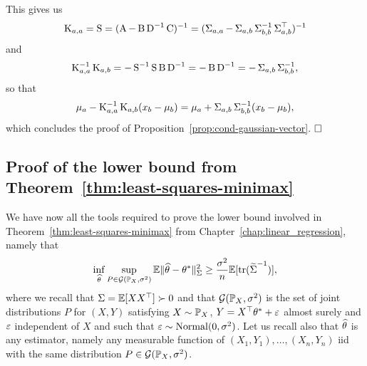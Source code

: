 This gives us
\begin{equation*}
	\bK_{a, a} = \bS = (\bA - \bB \bD^{-1} \bC)^{-1} = (\bSigma_{a,a} - \bSigma_{a,b} \bSigma_{b,b}^{-1} \bSigma_{a,b}^\top)^{-1}
\end{equation*}
and
\begin{equation*}
	\bK_{a,a}^{-1} \bK_{a,b} = - \bS^{-1} \bS \bB \bD^{-1} = - \bB \bD^{-1} = - \bSigma_{a,b} \bSigma_{b,b}^{-1},
\end{equation*}
so that
\begin{align*}
	\mu_a - \bK_{a, a}^{-1} \bK_{a, b} (x_b - \mu_b) = \mu_a + \bSigma_{a,b} \bSigma_{b,b}^{-1} (x_b - \mu_b),
\end{align*}
which concludes the proof of Proposition~\ref{prop:cond-gaussian-vector}. $\hfill \square$



\subsection{Proof of the lower bound from Theorem~\ref{thm:least-squares-minimax}} %
\label{sec:proof_of_the_minimax_lower_bound_}

We have now all the tools required to prove the lower bound involved in Theorem~\ref{thm:least-squares-minimax} from Chapter~\ref{chap:linear_regression}, namely that
\begin{equation}
	\inf_{\wh \theta} \sup_{P \in \cG(\P_X, \sigma^2)} \E \norm{\wh \theta - \theta^*}_{\bSigma}^2 
	\geq \frac{\sigma^2}{n} \E [\tr({\wt \bSigma}^{-1})],
\end{equation}
where we recall that  $\bSigma = \E[X X^\top] \succ 0$ and that $\cG(\P_X, \sigma^2)$ is the set of joint distributions $P$ for $(X, Y)$ satisfying $X \sim \P_X$, $Y = X^\top \theta^* + \eps$ almost surely and $\eps$ independent of $X$ and such that $\eps \sim \nor(0, \sigma^2)$.
Let us recall also that $\wh \theta$ is any estimator, namely any measurable function of $(X_1, Y_1), \ldots, (X_n, Y_n)$ iid with the same distribution $P \in \cG(\P_X, \sigma^2)$.

